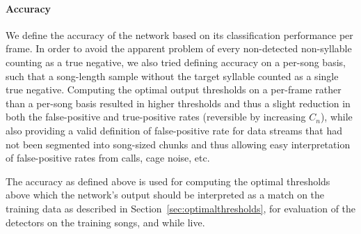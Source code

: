 \documentclass[10pt,letterpaper]{article}
\newcommand\sref[1]{Section~\ref{#1}}
\let\oldmarginpar\marginpar
\renewcommand{\marginpar}[1]{\oldmarginpar{\linespread{1}\scriptsize{#1}}}
\renewcommand{\subsubsection}[1]{\paragraph{#1}}
\begin{document}
\subsubsection{Accuracy}
\label{sec:accuracy}


We define the accuracy of the network based on its classification
performance per frame. In order to avoid the apparent problem of every
non-detected non-syllable counting as a true negative, we also tried
defining accuracy on a per-song basis, such that a song-length sample without the
target syllable counted as a single true negative.  Computing the
optimal output thresholds on a per-frame rather than a per-song basis resulted in higher
thresholds and thus a slight reduction in both the false-positive and true-positive rates (reversible by increasing $C_n$), while also providing a valid
definition of false-positive rate for data streams that had not been
segmented into song-sized chunks and thus allowing easy interpretation
of false-positive rates from calls, cage noise, etc.




The accuracy as defined above is used for computing the optimal
thresholds above which the network's output should be interpreted as a
match on the training data as described in
\sref{sec:optimalthresholds}, for evaluation of the detectors on the
training songs, and while live.
\end{document}
